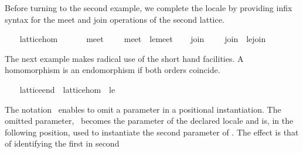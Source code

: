 \begin{isabellebody}
\begin{isamarkuptext}
  Before turning to the second example, we complete the locale by
  providing infix syntax for the meet and join operations of the
  second lattice.%
\end{isamarkuptext}%
\isamarkuptrue%
\ \ \isamarkupfalse%
\ lattice{}hom\isanewline
\ \ \isanewline
\ \ \isamarkupfalse%
\ meet{}\ {}\ {}{}{}{}{}\ {}{}{}\ \ {}meet{}\ {}\ le{}{}meet{}\isanewline
\ \ \isamarkupfalse%
\ join{}\ {}\ {}{}{}{}{}\ {}{}{}\ \ {}join{}\ {}\ le{}{}join{}\isanewline
\ \ \isamarkupfalse%
%
\begin{isamarkuptext}%
The next example makes radical use of the short hand
  facilities.  A homomorphism is an endomorphism if both orders
  coincide.%
\end{isamarkuptext}%
\isamarkuptrue%
\ \ \isamarkupfalse%
\ lattice{}end\ {}\ lattice{}hom\ {}\ le%
\begin{isamarkuptext}%
The notation~ enables to omit a parameter in a
  positional instantiation.  The omitted parameter,~ becomes
  the parameter of the declared locale and is, in the following
  position, used to instantiate the second parameter of .  The effect is that of identifying the first in second

\end{isamarkuptext}
\end{isabellebody}
